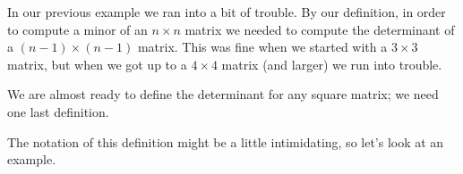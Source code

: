 \medskip

In our previous example we ran into a bit of trouble. By our definition, in order to compute a minor of an $n\times n$ matrix we needed to compute the determinant of a $(n-1)\times(n-1)$ matrix. This was fine when we started with a $3\times3$ matrix, but when we got up to a $4\times4$ matrix (and larger) we run into trouble.

We are almost ready to define the determinant for any square matrix; we need one last definition.

\smallskip


\smallskip

The notation of this definition might be a little intimidating, so let's look at an example.

\medskip

